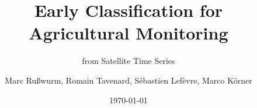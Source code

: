 \documentclass[%
  aspectratio=169,
  9pt,
  USenglish,
]{beamer}
\title{Early Classification for Agricultural Monitoring}
\subtitle{from Satellite Time Series}
\author[M. Rußwurm, R. Tavenard, S. Lefèvre, M.Körner]{Marc Rußwurm, Romain Tavenard, Sébastien Lefèvre, Marco Körner}
\institute[TUM, IRISA-Obelix, LETG-Rennes]{Technical University of Munich, Germany\\
                Remote Sensing Technology}
\date{\today}
\begin{document}
\begin{frame}[t]
  \titlepage
\end{frame}






\end{document}
